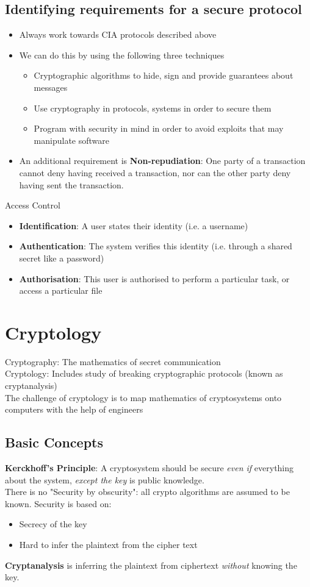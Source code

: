 \documentclass{article}
\begin{document}
\subsection{Identifying requirements for a secure protocol}
\begin{itemize}
    \item Always work towards CIA protocols described above
    \item We can do this by using the following three techniques
    \begin{itemize}
        \item Cryptographic algorithms to hide, sign and provide guarantees about messages
        \item Use cryptography in protocols, systems in order to secure them
        \item Program with security in mind in order to avoid exploits that may manipulate software
    \end{itemize}
    \item An additional requirement is \textbf{Non-repudiation}: One party of a transaction cannot deny having received a transaction, nor can the other party deny having sent the transaction.
\end{itemize}
Access Control
\begin{itemize}
    \item \textbf{Identification}: A user states their identity (i.e. a username)
    \item \textbf{Authentication}: The system verifies this identity (i.e. through a shared secret like a password)
    \item \textbf{Authorisation}: This user is authorised to perform a particular task, or access a particular file
\end{itemize}
\section{Cryptology}
Cryptography: The mathematics of secret communication
\\Cryptology: Includes study of breaking cryptographic protocols (known as cryptanalysis)
\\The challenge of cryptology is to map mathematics of cryptosystems onto computers with the help of engineers
\subsection{Basic Concepts}
\textbf{Kerckhoff's Principle}: A cryptosystem should be secure \textit{even if} everything about the system, \textit{except the key} is public knowledge.
\\There is no "Security by obscurity": all crypto algorithms are assumed to be known. Security is based on:
\begin{itemize}
    \item Secrecy of the key
    \item Hard to infer the plaintext from the cipher text
\end{itemize}
\textbf{Cryptanalysis} is inferring the plaintext from ciphertext \textit{without} knowing the key.
\end{document}
